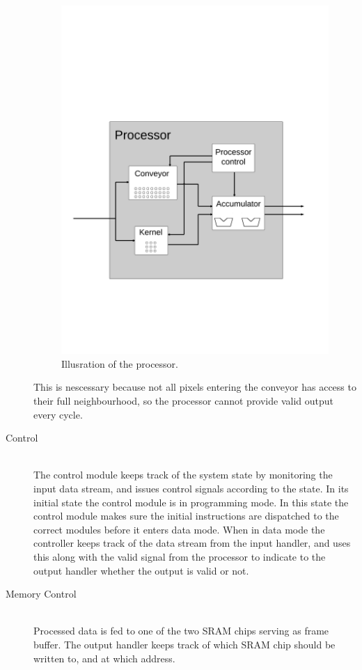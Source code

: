 \begin{description}
\begin{figure}[h!]
    \includegraphics[width=\linewidth]{img/processor.png}
    \caption{Illusration of the processor.}
    \label{fig:Convolution}
\end{figure}

        This is nescessary because not all pixels entering the conveyor has access to their full neighbourhood, so the processor cannot provide valid output every cycle.
    \item[Control] \hfill\\
        The control module keeps track of the system state by monitoring the input data stream, and issues control signals according to the state.
        In its initial state the control module is in programming mode. 
        In this state the control module makes sure the initial instructions are dispatched to the correct modules before it enters data mode.
        When in data mode the controller keeps track of the data stream from the input handler, and uses this along with the valid signal from the processor to indicate to the output handler whether the output is valid or not.
    \item[Memory Control] \hfill\\
        Processed data is fed to one of the two SRAM chips serving as frame buffer. The output handler keeps track of which SRAM chip should be written to, and at which address.
\end{description}

